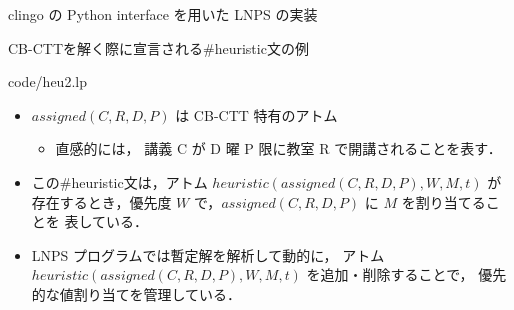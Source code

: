 \documentclass[11pt,dvipdfmx]{beamer}
\begin{document}
\begin{frame}{clingo の Python interface を用いた LNPS の実装}
\begin{exampleblock}{CB-CTTを解く際に宣言される\#heuristic文の例}

{code/heu2.lp}

\begin{itemize}
 \item \small $assigned(C,R,D,P)$ は CB-CTT 特有のアトム
  \begin{itemize}
   \item 直感的には，
   講義 C が D 曜 P 限に教室 R で開講されることを表す．
  \end{itemize}
 \end{itemize}
\end{exampleblock}
\bigskip
\begin{block}{}
\begin{itemize}
\item \small この\#heuristic文は，アトム $heuristic(assigned(C,R,D,P),W,M,t)$ が
存在するとき，優先度 $W$ で，$assigned(C,R,D,P)$ に $M$ を割り当てることを
表している．
\item \small LNPS プログラムでは暫定解を解析して動的に，
アトム $heuristic(assigned(C,R,D,P),W,M,t)$ を追加・削除することで，
優先的な値割り当てを管理している．
\end{itemize}
\end{block}
\end{frame}
\end{document}
